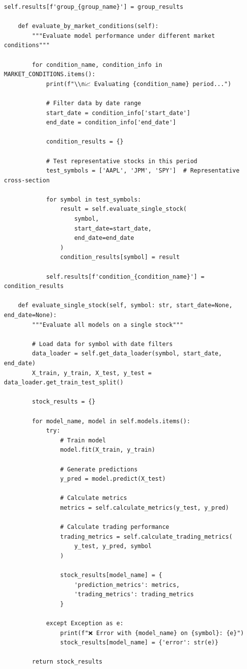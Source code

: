 \documentclass[11pt]{article}
\begin{document}
\begin{lstlisting}[style=pythonstyle, caption=Multi-Asset Evaluation Framework]
            self.results[f'group_{group_name}'] = group_results
            
    def evaluate_by_market_conditions(self):
        """Evaluate model performance under different market conditions"""
        
        for condition_name, condition_info in MARKET_CONDITIONS.items():
            print(f"\\n📈 Evaluating {condition_name} period...")
            
            # Filter data by date range
            start_date = condition_info['start_date']
            end_date = condition_info['end_date']
            
            condition_results = {}
            
            # Test representative stocks in this period
            test_symbols = ['AAPL', 'JPM', 'SPY']  # Representative cross-section
            
            for symbol in test_symbols:
                result = self.evaluate_single_stock(
                    symbol, 
                    start_date=start_date, 
                    end_date=end_date
                )
                condition_results[symbol] = result
                
            self.results[f'condition_{condition_name}'] = condition_results
            
    def evaluate_single_stock(self, symbol: str, start_date=None, end_date=None):
        """Evaluate all models on a single stock"""
        
        # Load data for symbol with date filters
        data_loader = self.get_data_loader(symbol, start_date, end_date)
        X_train, y_train, X_test, y_test = data_loader.get_train_test_split()
        
        stock_results = {}
        
        for model_name, model in self.models.items():
            try:
                # Train model
                model.fit(X_train, y_train)
                
                # Generate predictions
                y_pred = model.predict(X_test)
                
                # Calculate metrics
                metrics = self.calculate_metrics(y_test, y_pred)
                
                # Calculate trading performance
                trading_metrics = self.calculate_trading_metrics(
                    y_test, y_pred, symbol
                )
                
                stock_results[model_name] = {
                    'prediction_metrics': metrics,
                    'trading_metrics': trading_metrics
                }
                
            except Exception as e:
                print(f"❌ Error with {model_name} on {symbol}: {e}")
                stock_results[model_name] = {'error': str(e)}
                
        return stock_results
\end{lstlisting}
\end{document}
